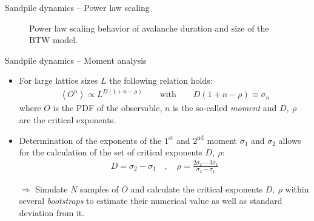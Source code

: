 \documentclass[xcolor=dvipsnames]{beamer}
\newcommand{\myitemsep}{\setlength\itemsep{0.33cm}}
\begin{document}
	\begin{frame}{Sandpile dynamics -- Power law scaling}
		\begin{figure}[h]
			\captionsetup{width=0.9\textwidth}
			\begin{center}
				\caption{Power law scaling behavior of avalanche duration and size of the BTW model.}
			\end{center}
		\end{figure}
	\end{frame}
	
	\begin{frame}{Sandpile dynamics -- Moment analysis}
		\begin{itemize}
			\myitemsep
			\item {For large lattice sizes $L$ the following relation holds:
				\begin{align*}
				\left\langle O^n \right\rangle \propto L^{D\left(1 + n - \rho \right)} \qquad \text{with} \qquad D\left(1 + n - \rho \right) \equiv \sigma_n 
				\end{align*}
				where $O$ is the PDF of the observable, $n$ is the so-called \textit{moment} and $D,\ \rho$ are the critical exponents.
				}
			\item {Determination of the exponents of the $1^{\text{st}}$ and $2^{\text{nd}}$ moment $\sigma_1$ and $\sigma_2$ allows for the calculation of the set of critical exponents $D,\ \rho$:
				\begin{align*}
				D = \sigma_2 - \sigma_1 \quad , \quad \rho = \frac{2\sigma_2 - 3\sigma_1}{\sigma_2 - \sigma_1} 
				\end{align*} 
				}
			\item[$\Rightarrow$] Simulate $N$ samples of $O$ and calculate the critical exponents $D,\ \rho$ within several \textit{bootstraps} to estimate their numerical value as well as standard deviation from it.
		\end{itemize}
	\end{frame}
		
\end{document}
